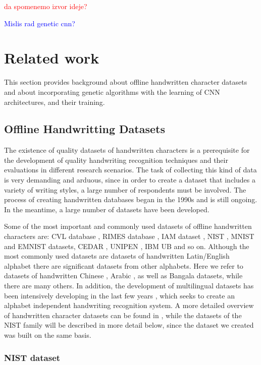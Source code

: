 \documentclass[eng]{simposium}
\begin{document}
\textcolor{red}{da spomenemo izvor ideje?}

\textcolor{blue}{Mislis rad genetic cnn?}

\section{Related work}

This section provides background about offline handwritten character datasets and about incorporating genetic algorithms 
with the learning of CNN architectures, and their training. 

\subsection{Offline Handwritting Datasets}

The existence of quality datasets of handwritten characters is a prerequisite for the development of quality handwriting 
recognition techniques and their evaluations in different research scenarios. 
The task of collecting this kind of data is very demanding and arduous, since in order to create a dataset that includes 
a variety of writing styles, a large number of respondents must be involved. 
The process of creating handwritten databases began in the 1990s\cite{9} and is still ongoing. 
In the meantime, a large number of datasets have been developed. 

Some of the most important and commonly used datasets of offline handwritten characters are: CVL database \cite{18}, RIMES database \cite{10}, IAM dataset \cite{11}, 
NIST \cite{12}\cite{13}, MNIST \cite{8} and EMNIST \cite{1} datasets, CEDAR \cite{14}, UNIPEN \cite{15}, IBM UB \cite{16} and so on. 
Although the most commonly used datasets are datasets of handwritten Latin/English alphabet 
there are significant datasets from other alphabets. 
Here we refer to datasets of handwritten Chinese \cite{19}\cite{20}\cite{21}, Arabic \cite{22}\cite{23}, as well as Bangala \cite{24}\cite{25} datasets, while there are many others. 
In addition, the development of multilingual datasets has been intensively developing in the last few years \cite{17}\cite{26}\cite{18}, which seeks to create an alphabet independent handwriting recognition system. 
A more detailed overview of handwritten character datasets can be found in \cite{9}, 
while the datasets of the NIST family will be described in more detail below, since the dataset we created was built on the same basis. 

\subsubsection{NIST dataset}
\end{document}
